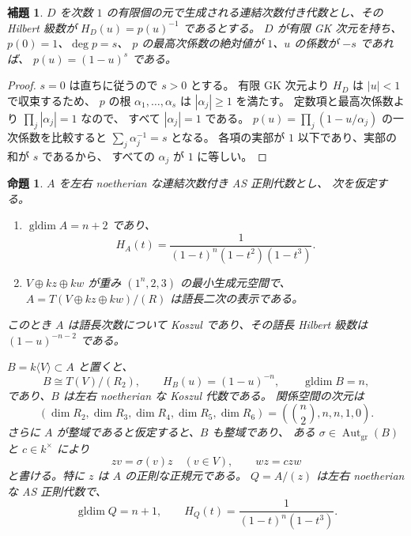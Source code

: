 \documentclass[11pt,a4paper]{ltjsarticle}
\newtheorem{proposition}[theorem]{命題}
\newtheorem{lemma}[theorem]{補題}
\theoremstyle{definition}
\begin{document}
\begin{lemma}\label{lem:unit-circle-hilbert}
$D$ を次数 $1$ の有限個の元で生成される連結次数付き代数とし、その Hilbert 級数が
$H_D(u)=p(u)^{-1}$ であるとする。
$D$ が有限 GK 次元を持ち、$p(0)=1$、$\deg p=s$、
$p$ の最高次係数の絶対値が $1$、$u$ の係数が $-s$ であれば、
$p(u)=(1-u)^s$ である。
\end{lemma}

\begin{proof}
$s=0$ は直ちに従うので $s>0$ とする。
有限 GK 次元より $H_D$ は $|u|<1$ で収束するため、
$p$ の根 $\alpha_1,\ldots,\alpha_s$ は $|\alpha_j|\geq1$ を満たす。
定数項と最高次係数より $\prod_j|\alpha_j|=1$ なので、
すべて $|\alpha_j|=1$ である。
$p(u)=\prod_j(1-u/\alpha_j)$ の一次係数を比較すると
$\sum_j\alpha_j^{-1}=s$ となる。
各項の実部が $1$ 以下であり、実部の和が $s$ であるから、
すべての $\alpha_j$ が $1$ に等しい。
\end{proof}

\begin{proposition}\label{prop:quadratic-general-structure}
$A$ を左右 noetherian な連結次数付き AS 正則代数とし、
次を仮定する。
\begin{enumerate}
 \item $\operatorname{gldim}A=n+2$ であり、
 \[
 H_A(t)=\frac{1}{(1-t)^n(1-t^2)(1-t^3)}.
 \]
 \item $V\oplus kz\oplus kw$ が重み $(1^n,2,3)$ の最小生成元空間で、
 $A=T(V\oplus kz\oplus kw)/(R)$ は語長二次の表示である。
\end{enumerate}
このとき $A$ は語長次数について Koszul であり、その語長 Hilbert 級数は
$(1-u)^{-n-2}$ である。

$B=k\langle V\rangle\subset A$ と置くと、
\[
 B\cong T(V)/(R_2),\qquad
 H_B(u)=(1-u)^{-n},\qquad
 \operatorname{gldim}B=n,
\]
であり、$B$ は左右 noetherian な Koszul 代数である。
関係空間の次元は
\begin{equation}\label{eq:general-quadratic-relation-numbers}
 (\dim R_2,\dim R_3,\dim R_4,\dim R_5,\dim R_6)
 =\left(\binom n2,n,n,1,0\right).
\end{equation}
さらに $A$ が整域であると仮定すると、$B$ も整域であり、
ある $\sigma\in\operatorname{Aut}_{\mathrm{gr}}(B)$ と $c\in k^\times$ により
\begin{equation}\label{eq:general-z-normal}
 zv=\sigma(v)z\quad(v\in V),\qquad wz=c zw
\end{equation}
と書ける。特に $z$ は $A$ の正則な正規元である。
$Q=A/(z)$ は左右 noetherian な AS 正則代数で、
\begin{equation}\label{eq:general-normal-quotient}
 \operatorname{gldim}Q=n+1,\qquad
 H_Q(t)=\frac{1}{(1-t)^n(1-t^3)}.
\end{equation}
\end{proposition}
\end{document}

